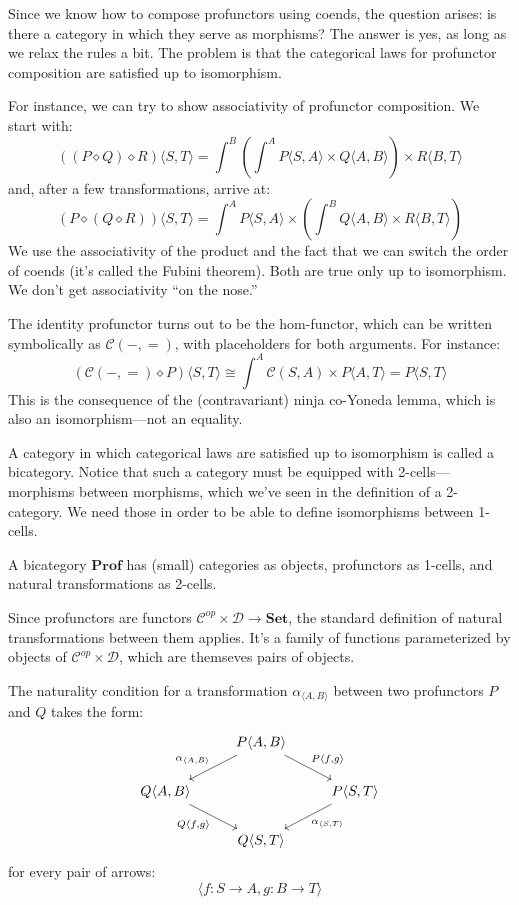 \documentclass[DaoFP]{subfiles}
\begin{document}
Since we know how to compose profunctors using coends, the question arises: is there a category in which they serve as morphisms? The answer is yes, as long as we relax the rules a bit. The problem is that the categorical laws for profunctor composition are satisfied up to isomorphism. 

For instance, we can try to show associativity of profunctor composition. We start with:
\[ ((P \diamond Q) \diamond R) \langle S, T \rangle = \int^B \left( \int^A P \langle S, A \rangle \times Q \langle A, B \rangle \right) \times R \langle B,  T \rangle \]
and, after a few transformations, arrive at:
\[ (P \diamond (Q \diamond R)) \langle S, T \rangle =  \int^A P \langle S, A \rangle \times \left( \int^B Q \langle A, B \rangle \times R \langle B,  T \rangle \right) \]
We use the associativity of the product and the fact that we can switch the order of coends (it's called the  Fubini theorem). Both are true only up to isomorphism. We don't get associativity ``on the nose.''

The identity profunctor turns out to be the hom-functor, which can be written symbolically as $\mathcal{C}(-, =)$, with placeholders for both arguments. For instance:
\[ \left( \mathcal{C}(-, =) \diamond P \right) \langle S, T \rangle \cong \int^A  \mathcal{C}(S, A) \times P \langle A, T \rangle = P \langle S, T \rangle \]
This is the consequence of the (contravariant) ninja co-Yoneda lemma, which is also an isomorphism---not an equality.

A category in which categorical laws are satisfied up to isomorphism is called a bicategory. Notice that such a category must be equipped with 2-cells---morphisms between morphisms, which we've seen in the definition of a 2-category. We need those in order to be able to define isomorphisms between 1-cells. 

A bicategory $\mathbf{Prof}$ has (small) categories as objects, profunctors as 1-cells, and natural transformations as 2-cells. 

Since profunctors are functors $\mathcal{C}^{op} \times  \mathcal{D} \to \mathbf{Set}$, the standard definition of natural transformations between them applies. It's a family of functions parameterized by objects of $\mathcal{C}^{op} \times  \mathcal{D}$, which are themseves pairs of objects. 

The naturality condition for a transformation $\alpha_{\langle A, B \rangle}$ between two profunctors $P$ and $Q$ takes the form:
\[
 \begin{tikzcd}
 &P \langle A, B \rangle
 \arrow[ld, "{\alpha_{\langle A, B \rangle}}"']
 \arrow[rd, "{P \langle f, g \rangle}"]
 \\
 Q \langle A, B \rangle
 \arrow[dr, "{Q \langle f, g \rangle}"']
 &&P \langle S, T \rangle
 \arrow[dl, "{\alpha_{\langle S, T \rangle}}"]
 \\
 & Q \langle S, T \rangle
 \end{tikzcd}
\]
for every pair of arrows:
\[ \langle f \colon S \to A, g \colon B \to T \rangle \]
\end{document}
